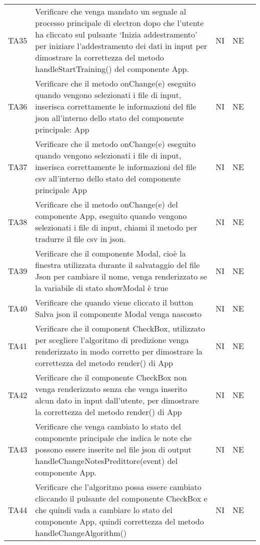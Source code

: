 \begin{longtable} {
		>{}p{15mm} 
		>{}p{79.5mm}
		>{}p{15mm} 
		>{}p{15mm}
		>{}p{0mm}}
	TA35	& Verificare che venga mandato un segnale al processo principale di electron dopo che l’utente ha cliccato sul pulsante ‘Inizia addestramento’ per iniziare l’addestramento dei dati in input per dimostrare la correttezza del metodo handleStartTraining() del componente App. & NI & NE &\TBstrut \\ [2mm]
	TA36	& Verificare che il metodo onChange(e) eseguito quando vengono selezionati i file di input, inserisca correttamente le informazioni del file json all'interno dello stato del componente principale: App & NI & NE &\TBstrut \\ [2mm]
	TA37	& Verificare che il metodo onChange(e) eseguito quando vengono selezionati i file di input, inserisca correttamente le informazioni del file csv all'interno dello stato del componente principale App & NI & NE &\TBstrut \\ [2mm]
	TA38	& Verificare che il metodo onChange(e) del componente App, eseguito quando vengono selezionati i file di input, chiami il metodo per tradurre il file csv in json. & NI & NE &\TBstrut \\ [2mm]
	TA39	& Verificare che il componente Modal, cioè la finestra utilizzata durante il salvataggio del file Json per cambiare il nome, venga renderizzato se la variabile di stato showModal è true & NI & NE &\TBstrut \\ [2mm]
	TA40	& Verificare che quando viene cliccato il button Salva json il componente Modal venga nascosto & NI & NE &\TBstrut \\ [2mm]
	TA41	& Verificare che il component CheckBox, utilizzato per scegliere l'algoritmo di predizione venga renderizzato in modo corretto per dimostrare la correttezza del metodo render() di App & NI & NE &\TBstrut \\ [2mm]
	TA42	& Verificare che il componente CheckBox non venga renderizzato senza che venga inserito alcun dato in input dall'utente, per dimostrare la correttezza del metodo render() di App & NI & NE &\TBstrut \\ [2mm]
	TA43	& Verificare che venga cambiato lo stato del componente principale che indica le note che possono essere inserite nel file json di output handleChangeNotesPredittore(event) del componente App. & NI & NE &\TBstrut \\ [2mm]
	TA44	& Verificare che l'algoritmo possa essere cambiato cliccando il pulsante del componente CheckBox e che quindi vada a cambiare lo stato del componente App, quindi correttezza del metodo handleChangeAlgorithm() & NI & NE &\TBstrut \\ [2mm]

\end{longtable}
